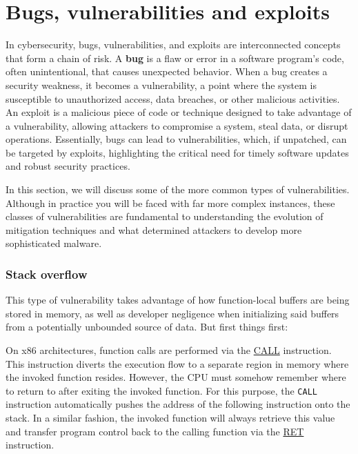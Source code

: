 \section{Bugs, vulnerabilities and exploits}

In cybersecurity, bugs, vulnerabilities, and exploits are interconnected
concepts that form a chain of risk. A \textbf{bug} is a flaw or error in a
software program's code, often unintentional, that causes unexpected behavior.
When a bug creates a security weakness, it becomes a vulnerability, a point
where the system is susceptible to unauthorized access, data breaches, or other
malicious activities. An exploit is a malicious piece of code or technique
designed to take advantage of a vulnerability, allowing attackers to compromise
a system, steal data, or disrupt operations. Essentially, bugs can lead to
vulnerabilities, which, if unpatched, can be targeted by exploits, highlighting
the critical need for timely software updates and robust security practices.

In this section, we will discuss some of the more common types of
vulnerabilities. Although in practice you will be faced with far more complex
instances, these classes of vulnerabilities are fundamental to understanding
the evolution of mitigation techniques and what determined attackers to develop
more sophisticated malware.

\subsubsection{Stack overflow}

This type of vulnerability takes advantage of how function-local buffers are
being stored in memory, as well as developer negligence when initializing said
buffers from a potentially unbounded source of data. But first things first:

On x86 architectures, function calls are performed via the
\href{https://www.felixcloutier.com/x86/call}{CALL} instruction. This instruction
diverts the execution flow to a separate region in memory where the invoked
function resides. However, the CPU must somehow remember where to return to
after exiting the invoked function. For this purpose, the \texttt{CALL}
instruction automatically pushes the address of the following instruction
onto the stack. In a similar fashion, the invoked function will always retrieve
this value and transfer program control back to the calling function via the
\href{https://www.felixcloutier.com/x86/ret}{RET} instruction.

